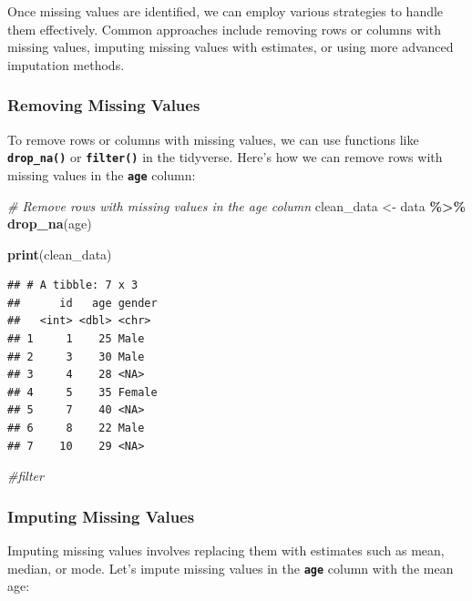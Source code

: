 \documentclass[
]{book}
\newenvironment{Shaded}{\begin{snugshade}}{\end{snugshade}}
\newcommand{\CommentTok}[1]{\textcolor[rgb]{0.56,0.35,0.01}{\textit{#1}}}
\newcommand{\FunctionTok}[1]{\textcolor[rgb]{0.13,0.29,0.53}{\textbf{#1}}}
\newcommand{\NormalTok}[1]{#1}
\newcommand{\OtherTok}[1]{\textcolor[rgb]{0.56,0.35,0.01}{#1}}
\newcommand{\SpecialCharTok}[1]{\textcolor[rgb]{0.81,0.36,0.00}{\textbf{#1}}}
\begin{document}
Once missing values are identified, we can employ various strategies to handle them effectively. Common approaches include removing rows or columns with missing values, imputing missing values with estimates, or using more advanced imputation methods.

\hypertarget{removing-missing-values}{%
\subsubsection{Removing Missing Values}\label{removing-missing-values}}

To remove rows or columns with missing values, we can use functions like \textbf{\texttt{drop\_na()}} or \textbf{\texttt{filter()}} in the tidyverse. Here's how we can remove rows with missing values in the \textbf{\texttt{age}} column:

\begin{Shaded}
\begin{Highlighting}[]
\CommentTok{\# Remove rows with missing values in the age column}
\NormalTok{clean\_data }\OtherTok{\textless{}{-}}\NormalTok{ data }\SpecialCharTok{\%\textgreater{}\%}
  \FunctionTok{drop\_na}\NormalTok{(age)}

\FunctionTok{print}\NormalTok{(clean\_data)}
\end{Highlighting}
\end{Shaded}

\begin{verbatim}
## # A tibble: 7 x 3
##      id   age gender
##   <int> <dbl> <chr> 
## 1     1    25 Male  
## 2     3    30 Male  
## 3     4    28 <NA>  
## 4     5    35 Female
## 5     7    40 <NA>  
## 6     8    22 Male  
## 7    10    29 <NA>
\end{verbatim}

\begin{Shaded}
\begin{Highlighting}[]
\CommentTok{\#filter}
\end{Highlighting}
\end{Shaded}

\hypertarget{imputing-missing-values}{%
\subsubsection{Imputing Missing Values}\label{imputing-missing-values}}

Imputing missing values involves replacing them with estimates such as mean, median, or mode. Let's impute missing values in the \textbf{\texttt{age}} column with the mean age:
\end{document}
